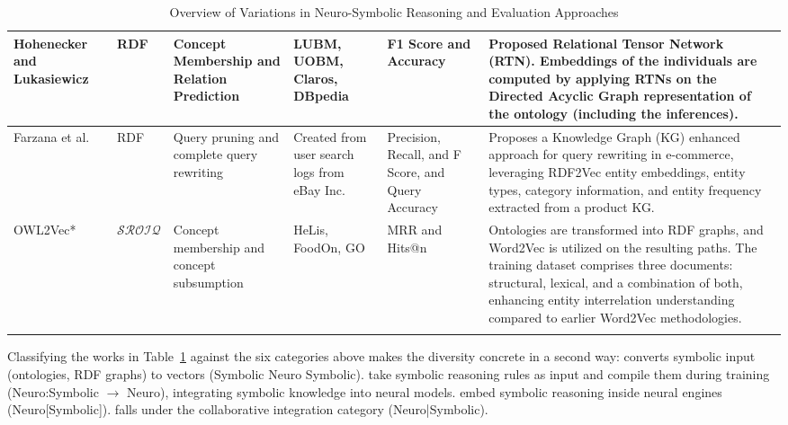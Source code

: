 {\begin{longtable}{|p{2.2cm}|p{1.2cm}|p{2.4cm}|p{2.0cm}|p{2.0cm}|p{4.0cm}|}
\hline
Hohenecker and Lukasiewicz ~\cite{DL_for_OR} & RDF & Concept Membership and Relation Prediction & LUBM, UOBM, Claros, DBpedia& F1 Score and Accuracy & Proposed Relational Tensor Network (RTN). Embeddings of the individuals are computed by applying RTNs on the Directed Acyclic Graph representation of the ontology (including the inferences).\\
\hline

Farzana et al.~\cite{query_rewriting} & RDF & Query pruning and complete query rewriting & Created from user search logs from eBay Inc.& Precision, Recall, and F Score, and Query Accuracy & Proposes a Knowledge Graph (KG) enhanced approach for query rewriting in e-commerce, leveraging RDF2Vec entity embeddings, entity types, category information, and entity frequency extracted from a product KG.\\
\hline

OWL2Vec* ~\cite{owl2vecstar} & $\mathcal{SROIQ}$ &Concept membership and concept subsumption &HeLis, FoodOn, GO & MRR and Hits@n & Ontologies are transformed into RDF graphs, and Word2Vec is utilized on the resulting paths. The training dataset comprises three documents: structural, lexical, and a combination of both, enhancing entity interrelation understanding compared to earlier Word2Vec methodologies.\\
\hline

\caption{Overview of Variations in Neuro-Symbolic Reasoning and Evaluation Approaches}

\label{tab:nesy}
\end{longtable}
}

Classifying the works in Table~\ref{tab:nesy} against the six categories above makes the diversity concrete in a second way: \cite{owl2vecstar} converts symbolic input (ontologies, RDF graphs) to vectors (Symbolic Neuro Symbolic). \cite{noise-tolerant,Ebrahimi2018ReasoningOR,pointer_nw,emulation,DL_for_OR,Explainable_rdfs_reasoning} take symbolic reasoning rules as input and compile them during training (Neuro:Symbolic $\rightarrow$ Neuro), integrating symbolic knowledge into neural models. \cite{ELEm,Mondal,why_settle_for_one,faithful_embeddings,cone_semantics,QuantumEmbedding,dualboxembeddings} embed symbolic reasoning inside neural engines (Neuro[Symbolic]). \cite{query_rewriting} falls under the collaborative integration category (Neuro|Symbolic).

